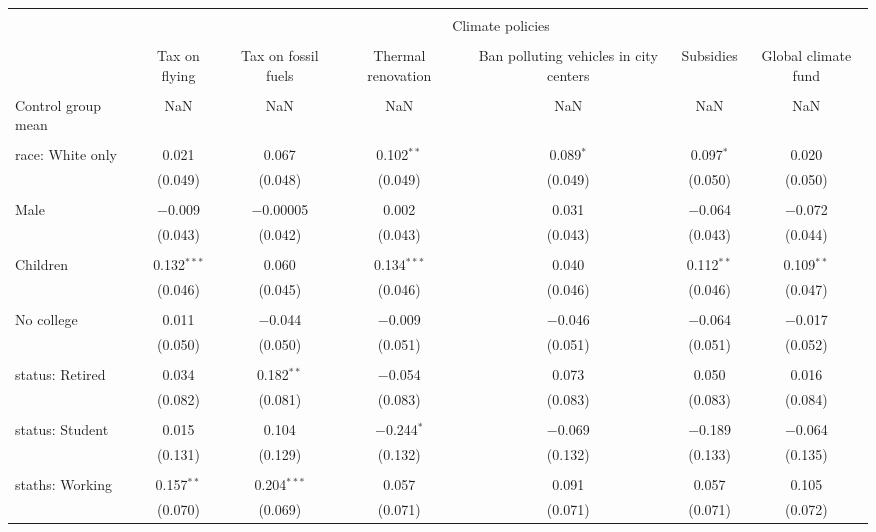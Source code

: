 
\begin{tabular}{@{\extracolsep{5pt}}lcccccc} 
\\[-1.8ex]\hline 
\hline \\[-1.8ex] 
 & \multicolumn{6}{c}{Climate policies} \\ 
\cline{2-7} 
\\[-1.8ex] & Tax on flying & Tax on fossil fuels & Thermal renovation & Ban polluting vehicles in city centers & Subsidies & Global climate fund \\ 
\hline \\[-1.8ex] 
 Control group mean & NaN & NaN & NaN & NaN & NaN & NaN  \\ \hline \\[-1.8ex] race: White only & 0.021 & 0.067 & 0.102$^{**}$ & 0.089$^{*}$ & 0.097$^{*}$ & 0.020 \\ 
  & (0.049) & (0.048) & (0.049) & (0.049) & (0.050) & (0.050) \\ 
  & & & & & & \\ 
 Male & $-$0.009 & $-$0.00005 & 0.002 & 0.031 & $-$0.064 & $-$0.072 \\ 
  & (0.043) & (0.042) & (0.043) & (0.043) & (0.043) & (0.044) \\ 
  & & & & & & \\ 
 Children & 0.132$^{***}$ & 0.060 & 0.134$^{***}$ & 0.040 & 0.112$^{**}$ & 0.109$^{**}$ \\ 
  & (0.046) & (0.045) & (0.046) & (0.046) & (0.046) & (0.047) \\ 
  & & & & & & \\ 
 No college & 0.011 & $-$0.044 & $-$0.009 & $-$0.046 & $-$0.064 & $-$0.017 \\ 
  & (0.050) & (0.050) & (0.051) & (0.051) & (0.051) & (0.052) \\ 
  & & & & & & \\ 
 status: Retired & 0.034 & 0.182$^{**}$ & $-$0.054 & 0.073 & 0.050 & 0.016 \\ 
  & (0.082) & (0.081) & (0.083) & (0.083) & (0.083) & (0.084) \\ 
  & & & & & & \\ 
 status: Student & 0.015 & 0.104 & $-$0.244$^{*}$ & $-$0.069 & $-$0.189 & $-$0.064 \\ 
  & (0.131) & (0.129) & (0.132) & (0.132) & (0.133) & (0.135) \\ 
  & & & & & & \\ 
 staths: Working & 0.157$^{**}$ & 0.204$^{***}$ & 0.057 & 0.091 & 0.057 & 0.105 \\ 
  & (0.070) & (0.069) & (0.071) & (0.071) & (0.071) & (0.072) \\ 

\end{tabular}
